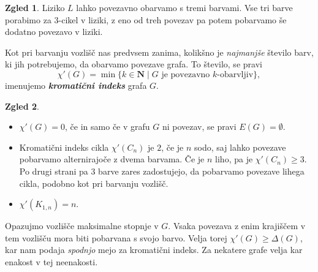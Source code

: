 \documentclass[11pt]{book}
\def\NN{\mathbf{N}}
\def\definicija{\color{rdeca}\bf\em}
\theoremstyle{definition}
\theoremstyle{zgled}
\newtheorem*{zgled}{Zgled}
\theoremstyle{odprtproblem}
\theoremstyle{domacanaloga}
\theoremstyle{izrek}
\begin{document}
\begin{zgled}
Liziko $L$ lahko povezavno obarvamo s tremi barvami. Vse tri barve porabimo za $3$-cikel v liziki, z eno od treh povezav pa potem pobarvamo še dodatno povezavo v liziki.
\end{zgled}

Kot pri barvanju vozlišč nas predvsem zanima, kolikšno je \emph{najmanjše} število barv, ki jih potrebujemo, da obarvamo povezave grafa. To število, se pravi
\[
\chi'(G) = \min \{ k \in \NN \mid \text{$G$ je povezavno $k$-obarvljiv} \},
\]
imenujemo {\definicija kromatični indeks} grafa $G$.

\begin{zgled} \leavevmode
\begin{itemize}
    \item $\chi'(G) = 0$, če in samo če v grafu $G$ ni povezav, se pravi $E(G) = \emptyset$.
    \item Kromatični indeks cikla $\chi'(C_n)$ je $2$, če je $n$ sodo, saj lahko povezave pobarvamo alternirajoče z dvema barvama. Če je $n$ liho, pa je $\chi'(C_n) \geq 3$. Po drugi strani pa $3$ barve zares zadostujejo, da pobarvamo povezave lihega cikla, podobno kot pri barvanju vozlišč.
    \item $\chi'(K_{1,n}) = n$.
\end{itemize}
\end{zgled}

Opazujmo vozlišče maksimalne stopnje v $G$. Vsaka povezava z enim krajiščem v tem vozlišču mora biti pobarvana s svojo barvo. Velja torej $\chi'(G) \geq \Delta(G)$, kar nam podaja \emph{spodnjo} mejo za kromatični indeks. Za nekatere grafe velja kar enakost v tej neenakosti.
\end{document}
